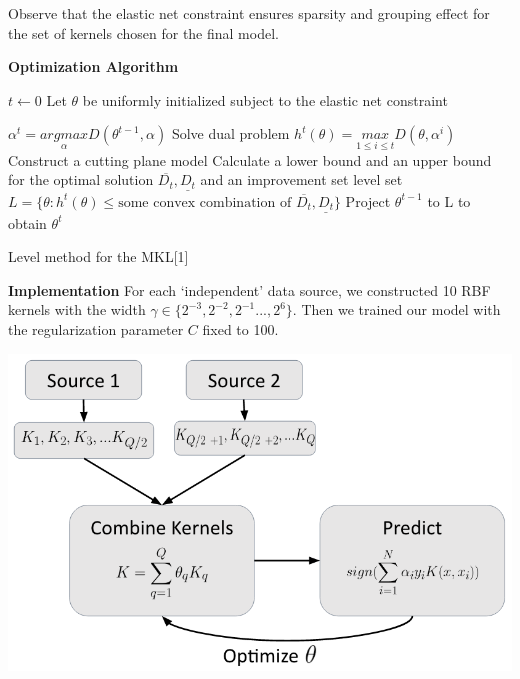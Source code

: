 \documentclass{article}
\begin{document}
Observe that the elastic net constraint ensures sparsity and grouping effect
for the set of kernels chosen for the final model.

\textbf{Optimization Algorithm}

\begin{algorithm}
\centering
\begin{algorithmic}[1]
    \item[] 
    \State $t \leftarrow 0$
    \State Let $\theta$ be uniformly initialized subject to the elastic net constraint

    \item[]
        \State $\alpha^{t} = \underset{\alpha}{argmax}D(\theta^{t-1}, \alpha)$
            \Comment Solve dual problem
        \State $h^t(\theta) = \underset{1 \leq i \leq t}{max} D(\theta, \alpha^i)$
            \Comment Construct a cutting plane model
        \State Calculate a lower bound and an upper bound for the optimal solution $\overline{D_t}, \underline{D_t}$ and an improvement set level set $L = \{\theta: h^t(\theta) \leq \text{some convex combination of }\overline{D_t}, \underline{D_t}\}$
        \State Project $\theta^{t-1}$ to L to obtain $\theta^t$
    \EndWhile
\end{algorithmic}
\caption{Level method for the MKL[1]}
\label{alg:gmkl}
\end{algorithm}

\textbf{Implementation}
For each `independent' data source, we constructed 10 RBF kernels with the
width $\gamma \in \{2^{-3}, 2^{-2}, 2^{-1} ..., 2^{6}\}$. Then we trained our
model with the regularization parameter $C$ fixed to 100.

\begin{minipage}{\textwidth}
    \centering
    \includegraphics[scale=.4]{implementation_flowchart.png}
    \label{fig:implementation_flowchart}
\end{minipage}
\end{document}
